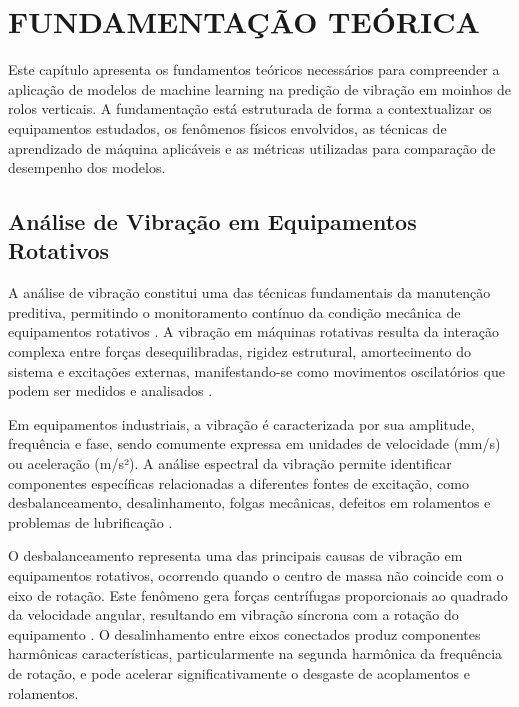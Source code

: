 \chapter{FUNDAMENTAÇÃO TEÓRICA}
\label{chap:fundamentacao-teorica}

Este capítulo apresenta os fundamentos teóricos necessários para compreender a aplicação de modelos de machine learning na predição de vibração em moinhos de rolos verticais. A fundamentação está estruturada de forma a contextualizar os equipamentos estudados, os fenômenos físicos envolvidos, as técnicas de aprendizado de máquina aplicáveis e as métricas utilizadas para comparação de desempenho dos modelos.

\section{Análise de Vibração em Equipamentos Rotativos}
\label{sec:analise-vibracao}

A análise de vibração constitui uma das técnicas fundamentais da manutenção preditiva, permitindo o monitoramento contínuo da condição mecânica de equipamentos rotativos \cite{rao2011mechanical}. A vibração em máquinas rotativas resulta da interação complexa entre forças desequilibradas, rigidez estrutural, amortecimento do sistema e excitações externas, manifestando-se como movimentos oscilatórios que podem ser medidos e analisados \cite{girdhar2004practical}.

Em equipamentos industriais, a vibração é caracterizada por sua amplitude, frequência e fase, sendo comumente expressa em unidades de velocidade (mm/s) ou aceleração (m/s²). A análise espectral da vibração permite identificar componentes específicas relacionadas a diferentes fontes de excitação, como desbalanceamento, desalinhamento, folgas mecânicas, defeitos em rolamentos e problemas de lubrificação \cite{mobley2002introduction}.

O desbalanceamento representa uma das principais causas de vibração em equipamentos rotativos, ocorrendo quando o centro de massa não coincide com o eixo de rotação. Este fenômeno gera forças centrífugas proporcionais ao quadrado da velocidade angular, resultando em vibração síncrona com a rotação do equipamento \cite{vance2010rotordynamics}. O desalinhamento entre eixos conectados produz componentes harmônicas características, particularmente na segunda harmônica da frequência de rotação, e pode acelerar significativamente o desgaste de acoplamentos e rolamentos.


